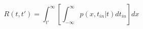 \begin{equation}
R(t,t') = \int_{t'}^\infty \left[ \int_{-\infty}^\infty p(x,t_{in}|t) dt_{in} \right]  dx
\end{equation}